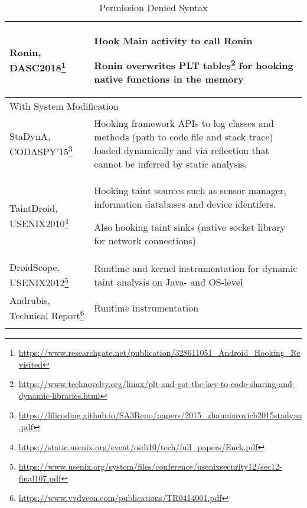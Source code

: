 \begin{longtable}{p{.3\linewidth}p{.7\linewidth}}
Ronin, DASC2018\footnote{\url{https://www.researchgate.net/publication/328611051_Android_Hooking_Revisited}}
&Hook Main activity to call Ronin

Ronin overwrites PLT tables\footnote{\url{https://www.technovelty.org/linux/plt-and-got-the-key-to-code-sharing-and-dynamic-libraries.html}}  for hooking native functions in the memory
\\

\midrule
\multicolumn{2}{l}{With System Modification}\\
\midrule

StaDynA, CODASPY'15\footnote{\url{https://lilicoding.github.io/SA3Repo/papers/2015_zhauniarovich2015stadyna.pdf}}
& Hooking framework APIs to log classes and methods (path to code file and stack trace) loaded dynamically and via reflection that cannot be inferred by static analysis.
\\

TaintDroid, USENIX2010\footnote{\url{https://static.usenix.org/event/osdi10/tech/full_papers/Enck.pdf}}
&Hooking taint sources such as sensor manager, information databases and device identifers.

Also hooking taint sinks (native socket library for network connections)
\\

DroidScope, USENIX2012\footnote{\url{https://www.usenix.org/system/files/conference/usenixsecurity12/sec12-final107.pdf}}
& Runtime and kernel instrumentation for dynamic taint analysis on Java- and OS-level
\\

Andrubis, Technical Report\footnote{\url{https://www.vvdveen.com/publications/TR0414001.pdf}}
& Runtime instrumentation
\\

\midrule
\caption{Permission Denied Syntax} 
\label{tab:permissiondeniedsyntax}
\end{longtable}

\pagebreak